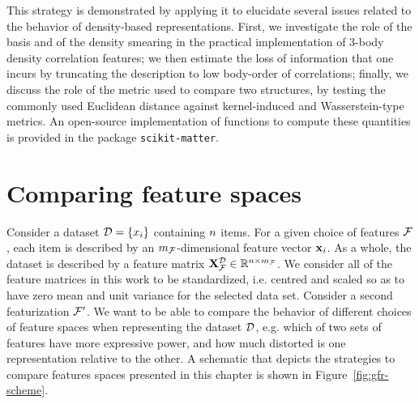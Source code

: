 This strategy is demonstrated by applying it to elucidate several issues related to the behavior of density-based representations.
First, we investigate the role of the basis and of the density smearing in the practical implementation of 3-body density correlation features; we then estimate the loss of information that one incurs by truncating the description to low body-order of correlations;  finally, we discuss the role of the metric used to compare two structures, by testing the commonly used Euclidean distance against kernel-induced and Wasserstein-type metrics.
An open-source implementation of functions to compute these quantities is provided in the package \texttt{scikit-matter}\cite{goscinski2023scikit}.


\section{Comparing feature spaces}
Consider a dataset $\mathcal{D}=\left\{x_i\right\}$ containing $n$ items. For a given choice of features $\mathcal{F}$, each item is described by an $m_{\mathcal{F}}$-dimensional feature vector $\mathbf{x}_i$. As a whole, the dataset is described by a feature matrix $\mathbf{X}_{\mathcal{F}}^{\mathcal{D}} \in \mathbb{R}^{n\times m_{\mathcal{F}}}$.
We consider all of the feature matrices in this work to be standardized, i.e. centred and scaled so as to have zero mean and unit variance for the selected data set.
Consider a second featurization $\mathcal{F}^{\prime}$. We want to be able to compare the behavior of different choices of feature spaces when representing the dataset $\mathcal{D}$, e.g. which of two sets of features have more expressive power, and how much distorted is one representation relative to the other.
A schematic that depicts the strategies to compare features spaces presented in this chapter is shown in Figure~\ref{fig:gfr-scheme}.

